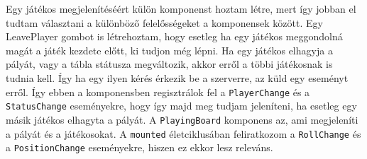 \documentclass[a4paper,twoside]{article}
\begin{document}
Egy játékos megjelenítéséért külön komponenst hoztam létre, mert így jobban el tudtam választani a különböző felelősségeket a komponensek között. Egy LeavePlayer gombot is létrehoztam, hogy esetleg ha egy játékos meggondolná magát a játék kezdete előtt, ki tudjon még lépni. 
Ha egy játékos elhagyja a pályát, vagy a tábla státusza megváltozik, akkor erről a többi játékosnak is tudnia kell. Így ha egy ilyen kérés érkezik be a szerverre, az küld egy eseményt erről. Így ebben a komponensben regisztrálok fel a \verb|PlayerChange| és a \verb|StatusChange| eseményekre, hogy így majd meg tudjam jeleníteni, ha esetleg egy másik játékos elhagyta a pályát. A \verb|PlayingBoard| komponens az, ami megjeleníti a pályát és a játékosokat. A \verb|mounted| életciklusában feliratkozom a \verb|RollChange| és a \verb|PositionChange| eseményekre, hiszen ez ekkor lesz releváns. 
\end{document}
